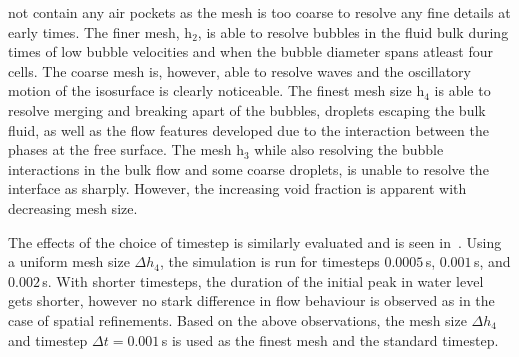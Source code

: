     not contain any air pockets as the mesh is too coarse to resolve any fine details at early times. The finer mesh, h$_{2}$, is able to resolve
    bubbles in the fluid bulk during times of low bubble velocities and when the bubble diameter spans atleast four cells.
    The coarse mesh is, however, able to resolve waves and the oscillatory motion of the isosurface is clearly noticeable.
    The finest mesh size h$_{4}$ is able to resolve merging and breaking apart 
    of the bubbles, droplets escaping the bulk fluid, as well as the flow features developed due to the interaction between the phases at the 
    free surface. The mesh h$_{3}$ while also resolving the bubble interactions in the bulk flow and some coarse droplets, is unable to resolve
    the interface as sharply. However, the increasing void fraction is apparent with decreasing mesh size. 

    The effects of the choice of timestep is similarly evaluated and is seen in~. Using a uniform mesh size $\Delta h_{4}$,
    the simulation is run for timesteps $0.0005\,$s, $0.001\,$s, and $0.002\,$s. With shorter timesteps, the duration 
    of the initial peak in water level gets shorter, however no stark difference in flow behaviour is observed as in the case of spatial 
    refinements. Based on the above observations, the mesh size $\Delta h_{4}$ and timestep $\Delta t = 0.001\,$s is used 
    as the finest mesh and the standard timestep.  
